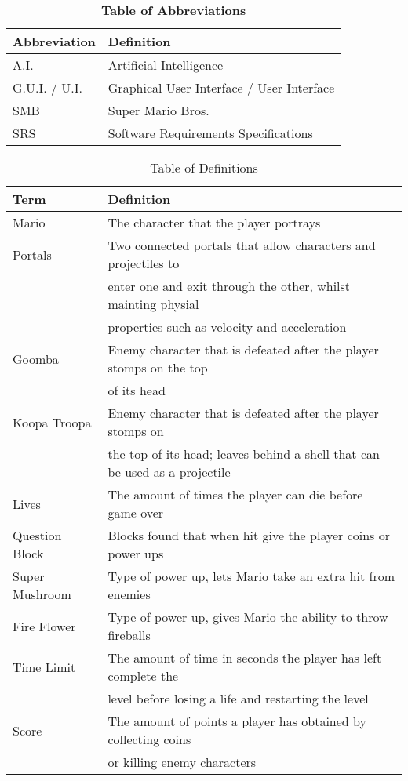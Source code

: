 \documentclass[12pt, titlepage]{article}
\begin{document}
\begin{table}[hbp]
\caption{\textbf{Table of Abbreviations}} \label{Table}

\begin{tabularx}{\textwidth}{p{3cm}X}
\toprule
\textbf{Abbreviation} & \textbf{Definition} \\
\midrule
A.I. & Artificial Intelligence\\
G.U.I. / U.I. & Graphical User Interface / User Interface\\
SMB & Super Mario Bros.\\
SRS & Software Requirements Specifications\\
\bottomrule
\end{tabularx}

\end{table}


\begin{table}
\caption{Table of Definitions}
\begin{tabular}{l l}
\hline
Term			& Definition \\
\hline
Mario      		 & The character that the player portrays  \\
Portals      		 & Two connected portals that allow characters and projectiles to \\
			 & enter one and exit through the other, whilst mainting physial \\
			 & properties such as velocity and acceleration \\
Goomba		 & Enemy character that is defeated after the player stomps on the top \\
			 & of its head	  \\
Koopa Troopa	 & Enemy character that is defeated after the player stomps on \\
			 & the top of its head; leaves behind a shell that can be used as a projectile	\\
Lives			 & The amount of times the player can die before game over	\\
Question Block	 & Blocks found that when hit give the player coins or power ups	\\
Super Mushroom	 & Type of power up, lets Mario take an extra hit from enemies	\\
Fire Flower		 & Type of power up, gives Mario the ability to throw fireballs	\\
Time Limit		 & The amount of time in seconds the player has left complete the \\
			 & level before losing a life and restarting the level	\\
Score			 & The amount of points a player has obtained by collecting coins \\
			 & or killing enemy characters	\\
\hline
\end{tabular}
\end{table}
\end{document}
